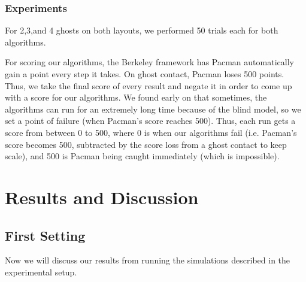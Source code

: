 \documentclass[11pt]{article}
\begin{document}
\subsubsection{Experiments}

For 2,3,and 4 ghosts on both layouts, we performed 50 trials each for both algorithms.  

For scoring our algorithms, the Berkeley framework has Pacman automatically gain a point every step it takes.  On ghost contact, Pacman loses 500 points.  Thus, we take the final score of every result and negate it in order to come up with a score for our algorithms.  We found early on that sometimes, the algorithms can run for an extremely long time because of the blind model, so we set a point of failure (when Pacman's score reaches 500).  Thus, each run gets a score from between 0 to 500, where 0 is when our algorithms fail (i.e. Pacman's score becomes 500, subtracted by the score loss from a ghost contact to keep scale), and 500 is Pacman being caught immediately (which is impossible).

\section{Results and Discussion}

\subsection{First Setting}
Now we will discuss our results from running the simulations described in the experimental setup. 
\end{document}
